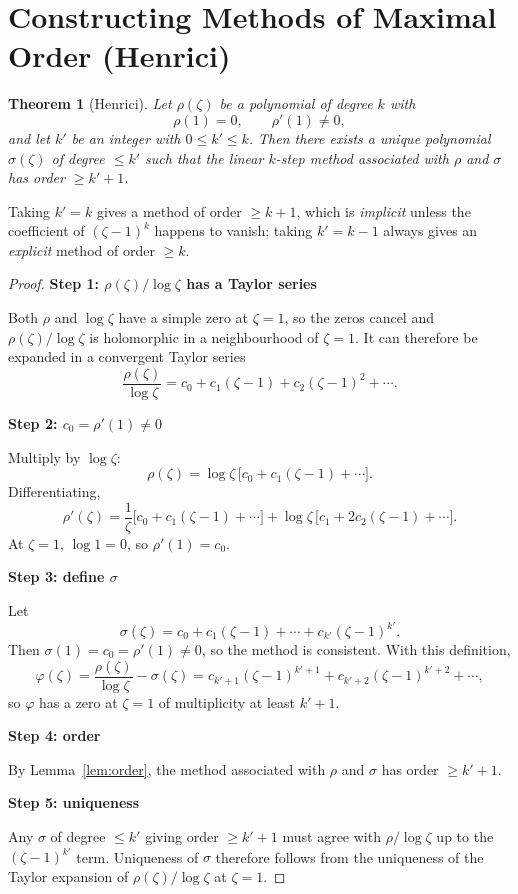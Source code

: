 \documentclass[11pt,a4paper]{article}
\numberwithin{equation}{section}
\theoremstyle{spacedplain}
\newtheorem{theorem}{Theorem}[section]
\theoremstyle{spaceddefinition}
\theoremstyle{spacedremark}
\newcommand{\step}[1]{\par\addvspace{0.6em}\noindent\textbf{#1}\par\nobreak}
\begin{document}
\section{Constructing Methods of Maximal Order (Henrici)}

\begin{keybox}
\begin{theorem}[Henrici]\label{thm:henrici}
Let \(\rho(\zeta)\) be a polynomial of degree \(k\) with
\[
  \rho(1)=0,\qquad \rho'(1)\ne0,
\]
and let \(k'\) be an integer with \(0\le k'\le k\).  Then there exists
a unique polynomial \(\sigma(\zeta)\) of degree \(\le k'\) such that
the linear \(k\)-step method associated with \(\rho\) and \(\sigma\)
has order \(\ge k'+1\).
\end{theorem}
\end{keybox}

Taking \(k'=k\) gives a method of order \(\ge k+1\), which is
\emph{implicit} unless the coefficient of \((\zeta-1)^k\) happens to
vanish; taking \(k'=k-1\) always gives an \emph{explicit} method of
order \(\ge k\).

\begin{proof}\leavevmode
\step{Step 1: \(\rho(\zeta)/\log\zeta\) has a Taylor series}
Both
\(\rho\) and \(\log\zeta\) have a simple zero at \(\zeta=1\), so the
zeros cancel and \(\rho(\zeta)/\log\zeta\) is holomorphic in a
neighbourhood of \(\zeta=1\).  It can therefore be expanded in a
convergent Taylor series
\[
  \frac{\rho(\zeta)}{\log\zeta}
  =c_0+c_1(\zeta-1)+c_2(\zeta-1)^2+\cdots.
\]

\step{Step 2: \(c_0=\rho'(1)\ne0\)}
Multiply by \(\log\zeta\):
\[
  \rho(\zeta)=\log\zeta\,\bigl[c_0+c_1(\zeta-1)+\cdots\bigr].
\]
Differentiating,
\[
  \rho'(\zeta)
  =\frac1\zeta\bigl[c_0+c_1(\zeta-1)+\cdots\bigr]
   +\log\zeta\,\bigl[c_1+2c_2(\zeta-1)+\cdots\bigr].
\]
At \(\zeta=1\), \(\log 1=0\), so \(\rho'(1)=c_0\).

\step{Step 3: define \(\sigma\)}
Let
\[
  \sigma(\zeta)=c_0+c_1(\zeta-1)+\cdots+c_{k'}(\zeta-1)^{k'}.
\]
Then \(\sigma(1)=c_0=\rho'(1)\ne0\), so the method is consistent.
With this definition,
\[
  \varphi(\zeta)
  =\frac{\rho(\zeta)}{\log\zeta}-\sigma(\zeta)
  =c_{k'+1}(\zeta-1)^{k'+1}+c_{k'+2}(\zeta-1)^{k'+2}+\cdots,
\]
so \(\varphi\) has a zero at \(\zeta=1\) of multiplicity at least
\(k'+1\).

\step{Step 4: order}
By Lemma~\ref{lem:order}, the method
associated with \(\rho\) and \(\sigma\) has order \(\ge k'+1\).

\step{Step 5: uniqueness}
Any \(\sigma\) of degree \(\le k'\)
giving order \(\ge k'+1\) must agree with \(\rho/\log\zeta\) up to the
\((\zeta-1)^{k'}\) term.  Uniqueness of \(\sigma\) therefore follows
from the uniqueness of the Taylor expansion of
\(\rho(\zeta)/\log\zeta\) at \(\zeta=1\).
\end{proof}
\end{document}
